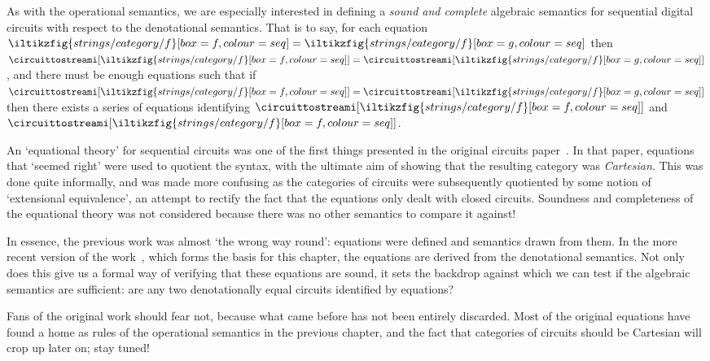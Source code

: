 As with the operational semantics, we are especially interested in defining a
\emph{sound and complete} algebraic semantics for sequential digital circuits
with respect to the denotational semantics.
That is to say, for each equation \(
    \iltikzfig{strings/category/f}[box=f,colour=seq]
    =
    \iltikzfig{strings/category/f}[box=g,colour=seq]
\) then \(
    \circuittostreami[\iltikzfig{strings/category/f}[box=f,colour=seq]]
    =
    \circuittostreami[\iltikzfig{strings/category/f}[box=g,colour=seq]]
\), and there must be enough equations such that if \(
    \circuittostreami[\iltikzfig{strings/category/f}[box=f,colour=seq]]
    =
    \circuittostreami[\iltikzfig{strings/category/f}[box=g,colour=seq]]
\) then there exists a series of equations identifying \(
    \circuittostreami[\iltikzfig{strings/category/f}[box=f,colour=seq]]
\) and \(
    \circuittostreami[\iltikzfig{strings/category/f}[box=f,colour=seq]]
\).

\begin{remark}
    An `equational theory' for sequential circuits was one of the first things
    presented in the original circuits
    paper~\cite{ghica2016categorical,ghica2017diagrammatic}.
    In that paper, equations that `seemed right' were used to quotient the
    syntax, with the ultimate aim of showing that the resulting category was
    \emph{Cartesian}.
    This was done quite informally, and was made more confusing as
    the categories of circuits were subsequently quotiented by some notion of
    `extensional equivalence', an attempt to rectify the fact that the
    equations only dealt with closed circuits.
    Soundness and completeness of the equational theory was not considered
    because there was no other semantics to compare it against!

    In essence, the previous work was almost `the wrong way round': equations
    were defined and semantics drawn from them.
    In the more recent version of the work~\cite[Sec. 5]{ghica2024fully}, which
    forms the basis for this chapter, the equations are derived from the
    denotational semantics.
    Not only does this give us a formal way of verifying that these equations
    are sound, it sets the backdrop against which we can test if the algebraic
    semantics are sufficient: are any two denotationally equal circuits
    identified by equations?

    Fans of the original work should fear not, because what came before has not
    been entirely discarded.
    Most of the original equations have found a home as rules of the operational
    semantics in the previous chapter, and the fact that categories of circuits
    should be Cartesian will crop up later on; stay tuned!
\end{remark}

